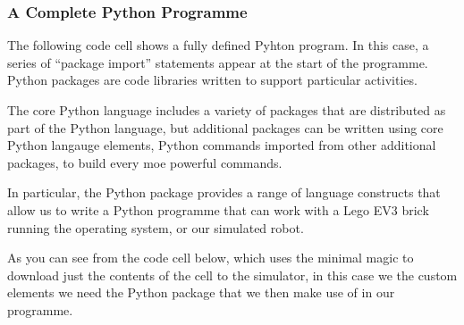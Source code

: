 \documentclass[letterpaper,10pt,english]{sphinxmanual}
\begin{document}
\subsubsection{A Complete Python Programme}
\label{\detokenize{content/00_SOFTWARE_GUIDE/Section_00_03_quick_practical_tour:A-Complete-Python-Programme}}
The following code cell shows a fully defined Pyhton program. In this case, a series of “package import” statements appear at the start of the programme. Python packages are code libraries written to support particular activities.

The core Python language includes a variety of packages that are distributed as part of the Python language, but additional packages can be written using core Python langauge elements,  Python commands imported from other additional packages, to build every moe powerful commands.

In particular, the Python  package provides a range of language constructs that allow us to write a Python programme that can work with a Lego EV3 brick running the  operating system, or our  simulated robot.

As you can see from the code cell below, which uses the minimal  magic to download just the contents of the cell to the simulator, in this case we  the custom elements we need  the  Python package that we then make use of in our programme.
\end{document}
